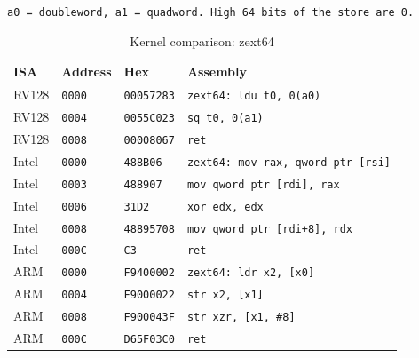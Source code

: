 \begin{table}[htbp]
\centering
\caption{Kernel comparison: zext64}
\begingroup
\scriptsize
\setlength{\tabcolsep}{4pt}
\noindent \texttt{a0 = doubleword, a1 = quadword. High 64 bits of the store are 0.}\par
\vspace{0.6ex}
\begin{tabular}{@{}l|l|l|p{7.2cm}@{}}
\toprule
ISA & Address & Hex & Assembly \\
\midrule
RV128 & \texttt{0000} & \texttt{00057283} & \texttt{zext64: ldu t0, 0(a0)} \\
RV128 & \texttt{0004} & \texttt{0055C023} & \texttt{sq t0, 0(a1)} \\
RV128 & \texttt{0008} & \texttt{00008067} & \texttt{ret} \\
\midrule
Intel & \texttt{0000} & \texttt{488B06} & \texttt{zext64: mov rax, qword ptr [rsi]} \\
Intel & \texttt{0003} & \texttt{488907} & \texttt{mov qword ptr [rdi], rax} \\
Intel & \texttt{0006} & \texttt{31D2} & \texttt{xor edx, edx} \\
Intel & \texttt{0008} & \texttt{48895708} & \texttt{mov qword ptr [rdi+8], rdx} \\
Intel & \texttt{000C} & \texttt{C3} & \texttt{ret} \\
\midrule
ARM & \texttt{0000} & \texttt{F9400002} & \texttt{zext64: ldr x2, [x0]} \\
ARM & \texttt{0004} & \texttt{F9000022} & \texttt{str x2, [x1]} \\
ARM & \texttt{0008} & \texttt{F900043F} & \texttt{str xzr, [x1, \#8]} \\
ARM & \texttt{000C} & \texttt{D65F03C0} & \texttt{ret} \\
\bottomrule
\end{tabular}
\endgroup
\end{table}
\noindent{}\par
